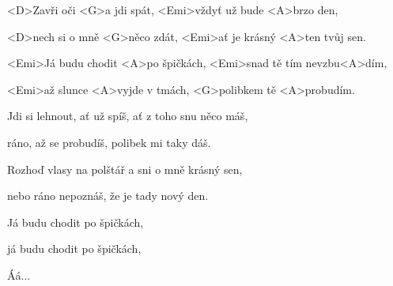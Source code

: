 

\zs
<D>Zavři oči <G>a jdi spát,
<Emi>vždyť už bude <A>brzo den,

<D>nech si o mně <G>něco zdát,
<Emi>ať je krásný <A>ten tvůj sen.
\ks

\zr
<Emi>Já budu chodit <A>po špičkách,
<Emi>snad tě tím nevzbu<A>dím,

<Emi>až slunce <A>vyjde v tmách,
<G>polibkem tě <A>probudím.
\kr

\zs
Jdi si lehnout, ať už spíš, ať z toho snu něco máš,

ráno, až se probudíš, polibek mi taky dáš.
\ks

\zr\kr

\zs
Rozhoď vlasy na polštář a sni o mně krásný sen,

nebo ráno nepoznáš, že je tady nový den.
\ks

\zr
Já budu chodit po špičkách,

já budu chodit po špičkách,

Áá...
\kr

\kp
